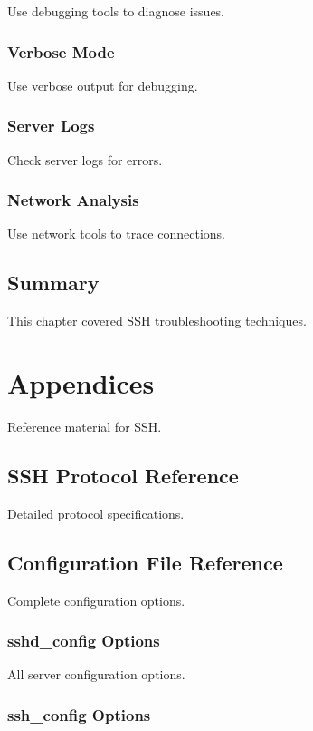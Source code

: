 \documentclass[12pt]{book}
\begin{document}
Use debugging tools to diagnose issues.

\subsection{Verbose Mode}

Use verbose output for debugging.

\subsection{Server Logs}

Check server logs for errors.

\subsection{Network Analysis}

Use network tools to trace connections.

\section{Summary}

This chapter covered SSH troubleshooting techniques.

\chapter{Appendices}

Reference material for SSH.

\section{SSH Protocol Reference}

Detailed protocol specifications.

\section{Configuration File Reference}

Complete configuration options.

\subsection{sshd_config Options}

All server configuration options.

\subsection{ssh_config Options}
\end{document}
